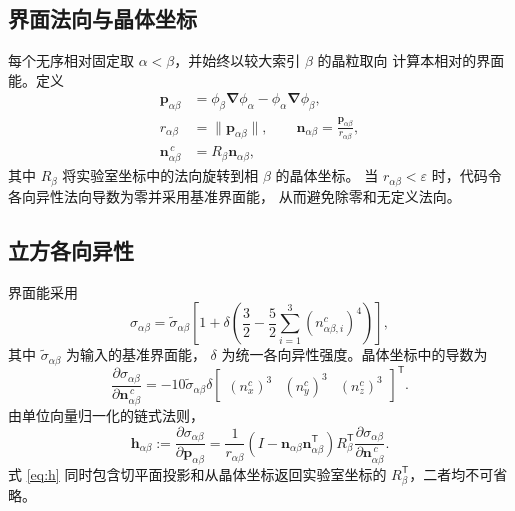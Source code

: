 \documentclass[UTF8,a4paper,11pt]{ctexart}
\newcommand{\grad}{\bm{\nabla}}
\newcommand{\vct}[1]{\bm{#1}}
\begin{document}
\subsection{界面法向与晶体坐标}

每个无序相对固定取 \(\alpha<\beta\)，并始终以较大索引 \(\beta\) 的晶粒取向
计算本相对的界面能。定义
\begin{align}
 \vct p_{\alpha\beta}
 &=\phi_\beta\grad\phi_\alpha-\phi_\alpha\grad\phi_\beta,\\
 r_{\alpha\beta}&=\lVert\vct p_{\alpha\beta}\rVert,\qquad
 \vct n_{\alpha\beta}=\frac{\vct p_{\alpha\beta}}{r_{\alpha\beta}},\\
 \vct n_{\alpha\beta}^{\,c}
 &=R_\beta\vct n_{\alpha\beta},
\end{align}
其中 \(R_\beta\) 将实验室坐标中的法向旋转到相 \(\beta\) 的晶体坐标。
当 \(r_{\alpha\beta}<\varepsilon\) 时，代码令各向异性法向导数为零并采用基准界面能，
从而避免除零和无定义法向。

\subsection{立方各向异性}

界面能采用
\begin{equation}
 \sigma_{\alpha\beta}
 =\widetilde\sigma_{\alpha\beta}
 \left[
 1+\delta\left(
 \frac{3}{2}
 -\frac{5}{2}\sum_{i=1}^{3}
 (n_{\alpha\beta,i}^{c})^4
 \right)
 \right],
\label{eq:sigma}
\end{equation}
其中 \(\widetilde\sigma_{\alpha\beta}\) 为输入的基准界面能，
\(\delta\) 为统一各向异性强度。晶体坐标中的导数为
\begin{equation}
 \frac{\partial\sigma_{\alpha\beta}}
      {\partial\vct n_{\alpha\beta}^{\,c}}
 =-10\widetilde\sigma_{\alpha\beta}\delta
 \begin{bmatrix}
 (n_x^c)^3&(n_y^c)^3&(n_z^c)^3
 \end{bmatrix}^{\mathsf T}.
\end{equation}
由单位向量归一化的链式法则，
\begin{equation}
 \vct h_{\alpha\beta}
 :=\frac{\partial\sigma_{\alpha\beta}}{\partial\vct p_{\alpha\beta}}
 =\frac{1}{r_{\alpha\beta}}
 \left(I-\vct n_{\alpha\beta}\vct n_{\alpha\beta}^{\mathsf T}\right)
 R_\beta^{\mathsf T}
 \frac{\partial\sigma_{\alpha\beta}}
      {\partial\vct n_{\alpha\beta}^{\,c}} .
\label{eq:h}
\end{equation}
式 \eqref{eq:h} 同时包含切平面投影和从晶体坐标返回实验室坐标的
\(R_\beta^{\mathsf T}\)，二者均不可省略。
\end{document}

